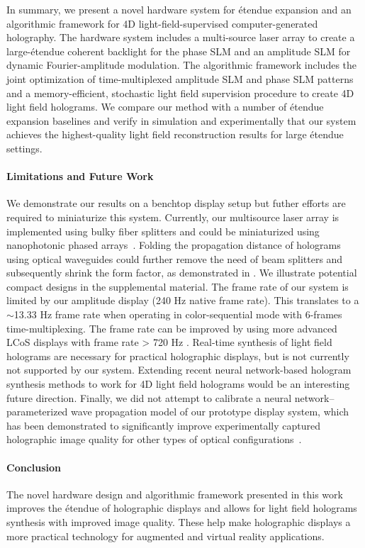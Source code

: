 In summary, we present a novel hardware system for \'etendue expansion and an algorithmic framework for 4D light-field-supervised computer-generated holography. The hardware system includes a multi-source laser array to create a large-\'etendue coherent backlight for the phase SLM and an amplitude SLM for dynamic Fourier-amplitude modulation. The algorithmic framework includes the joint optimization of time-multiplexed amplitude SLM and phase SLM patterns and a memory-efficient, stochastic light field supervision procedure to create 4D light field holograms. We compare our method with a number of \'etendue expansion baselines and verify in simulation and experimentally that our system achieves the highest-quality light field reconstruction results for large \'etendue settings. 

\paragraph{\bf{Limitations and Future Work}} 
We demonstrate our results on a benchtop display setup but futher efforts are required to miniaturize this system. Currently, our multisource laser array is implemented using bulky fiber splitters and could be miniaturized using nanophotonic phased arrays~\cite{sun2013large}. Folding the propagation distance of holograms using optical waveguides could further remove the need of beam splitters and subsequently shrink the form factor, as demonstrated in \cite{jang2024waveguide, yeom2021voxel, lin2018wedge, lin2020waveguide}. We illustrate potential compact designs in the supplemental material. The frame rate of our system is limited by our amplitude display (240 Hz native frame rate). This translates to a $\sim$13.33 Hz frame rate when operating in color-sequential mode with 6-frames time-multiplexing. The frame rate can be improved by using more advanced LCoS displays with frame rate > 720 Hz \cite{lazarev2017lcos}. Real-time synthesis of light field holograms are necessary for practical holographic displays, but is not currently not supported by our system. Extending recent neural network-based hologram synthesis methods \cite{shi2021neural, Shi2022-ih, yang2022diffeng} to work for 4D light field holograms would be an interesting future direction. Finally, we did not attempt to calibrate a neural network--parameterized wave propagation model of our prototype display system, which has been demonstrated to significantly improve experimentally captured holographic image quality for other types of optical configurations~\cite{peng2020neural,choi2022flex}.

\paragraph{\bf{Conclusion}} The novel hardware design and algorithmic framework presented in this work improves the \'etendue of holographic displays and allows for light field holograms synthesis with improved image quality. These help make holographic displays a more practical technology for augmented and virtual reality applications. 